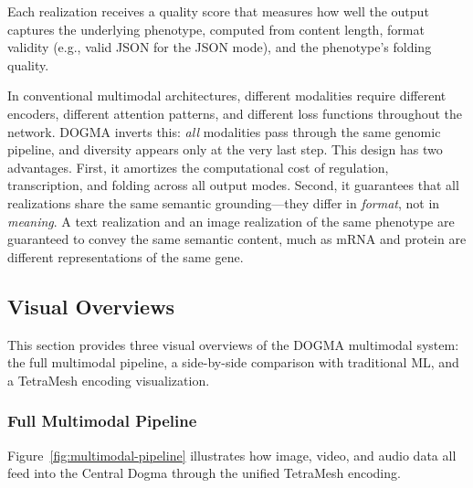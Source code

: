 Each realization receives a quality score that measures how well the output captures the underlying phenotype, computed from content length, format validity (e.g., valid JSON for the JSON mode), and the phenotype's folding quality.

\begin{keyinsight}
In conventional multimodal architectures, different modalities require different encoders, different attention patterns, and different loss functions throughout the network. DOGMA inverts this: \emph{all} modalities pass through the same genomic pipeline, and diversity appears only at the very last step. This design has two advantages. First, it amortizes the computational cost of regulation, transcription, and folding across all output modes. Second, it guarantees that all realizations share the same semantic grounding---they differ in \emph{format}, not in \emph{meaning}. A text realization and an image realization of the same phenotype are guaranteed to convey the same semantic content, much as mRNA and protein are different representations of the same gene.
\end{keyinsight}

\subsection{Visual Overviews}

This section provides three visual overviews of the DOGMA multimodal system: the full multimodal pipeline, a side-by-side comparison with traditional ML, and a TetraMesh encoding visualization.

\subsubsection{Full Multimodal Pipeline}

Figure~\ref{fig:multimodal-pipeline} illustrates how image, video, and audio data all feed into the Central Dogma through the unified TetraMesh encoding.


